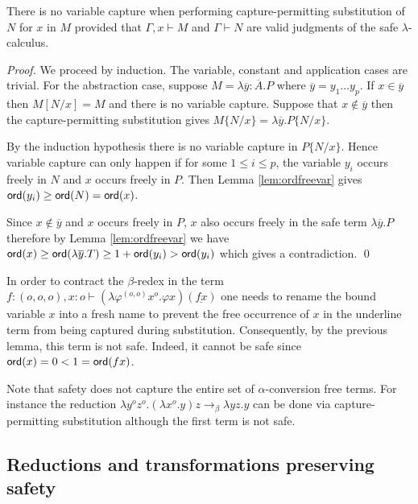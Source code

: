 \documentclass{llncs}
\newcommand\betared{\rightarrow_\beta}
\newcommand\subst[2]{\left[ #1/#2 \right]}
\newcommand\captsubst[2]{\{#1/#2 \}}
\newcommand\ord[1]{{\sf ord}(#1)}
\begin{document}
\begin{lemma}
\label{lem:homog_nocapture} There is
no variable capture when performing capture-permitting
substitution of $N$ for $x$ in $M$
provided that $\Gamma, x \vdash M$ and $\Gamma \vdash  N$ are valid judgments of the safe $\lambda$-calculus.
\end{lemma}

\begin{proof}
We proceed by induction. The variable, constant and
application cases are trivial. For the abstraction case, suppose $M
= \lambda \overline{y} : \overline{A}. P$ where $\overline{y} = y_1
\ldots y_p$. If $x \in \overline{y}$ then $M \subst{N}{x} = M$ and there is no variable capture.
Suppose that $x \not\in \overline{y}$ then the capture-permitting substitution gives
$M \captsubst{N}{x} = \lambda \overline{y} . P \captsubst{N}{x}$.

By the induction hypothesis there is no variable capture in $P \captsubst{N}{x}$.
Hence variable capture can only happen if for some $1 \leq i \leq p$, the variable $y_i$
occurs freely in $N$ and $x$ occurs freely in $P$. Then Lemma \ref{lem:ordfreevar} gives
$ \ord{y_i} \geq \ord{N} = \ord{x}$.

Since $x \not \in \overline{y}$ and $x$ occurs freely in $P$, $x$ also occurs freely in the safe term
$\lambda \overline{y}. P$ therefore by Lemma \ref{lem:ordfreevar} we have
$ \ord{x} \geq \ord{\lambda \overline{y} . T} \geq 1+ \ord{y_i} > \ord{y_i}$
which gives a contradiction. \qed
\end{proof}

\begin{example}
In order to contract the $\beta$-redex in the term $f:(o,o,o),x:o \vdash (\lambda \varphi^{(o,o)} x^o . \varphi x) (\underline{f x})$ one needs to rename the bound variable $x$ into a fresh name to prevent the free occurrence of $x$ in the underline term from being captured during substitution. Consequently, by the previous lemma, this term is not safe. Indeed, it cannot be safe since $\ord{x} = 0 < 1 = \ord{f x}$.
\end{example}

Note that safety does not capture the entire set of $\alpha$-conversion free terms. For instance the reduction $\lambda y^o z^o. (\lambda x^o .y) z \betared \lambda yz.y$ can be done via capture-permitting substitution although the first term is not safe.

\subsection{Reductions and transformations preserving safety}
\end{document}
